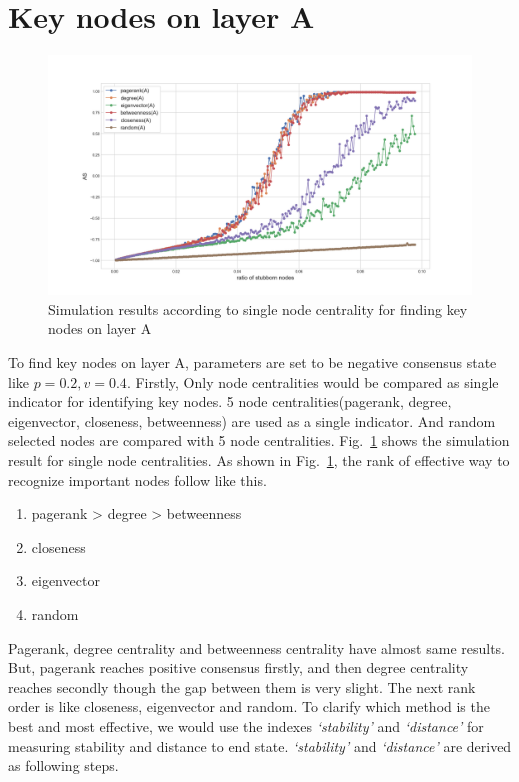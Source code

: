 \section{Key nodes on layer A}
\begin{figure}[!htb]
	\centering
	\includegraphics[width=\hsize]{figure/chap5_keynode_A_1.png}
	\caption{Simulation results according to single node centrality for finding key nodes on layer A}
	\label{chap5_keynode_A_1}
\end{figure}
To find key nodes on layer A, parameters are set to be negative consensus state like $p=0.2, v=0.4$. Firstly, Only node centralities would be compared as single indicator for identifying key nodes. 5 node centralities(pagerank, degree, eigenvector, closeness, betweenness) are used as a single indicator. And random selected nodes are compared with 5 node centralities. 
Fig.~\ref{chap5_keynode_A_1} shows the simulation result for single node centralities. As shown in Fig.~\ref{chap5_keynode_A_1}, the rank of effective way to recognize important nodes follow like this. 
\begin{enumerate}
	\item pagerank > degree > betweenness  
	\item closeness
	\item eigenvector       
	\item random
\end{enumerate}
Pagerank, degree centrality and betweenness centrality have almost same results. But, pagerank reaches positive consensus firstly, and then degree centrality reaches secondly though the gap between them is very slight. The next rank order is like closeness, eigenvector and random. To clarify which method is the best and most effective, we would use the indexes \textit{ `stability'} and \textit{`distance' } for measuring stability and distance to end state. \textit{`stability'} and \textit{`distance'} are derived as following steps. 
